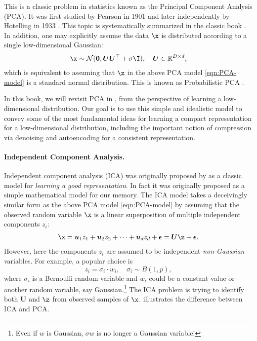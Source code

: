 \documentclass[../../book-main.tex]{subfiles}
\begin{document}
This is a classic problem in statistics known as the Principal Component Analysis (PCA). It was first studied by Pearson in 1901 \cite{Pearson1901} and later independently by Hotelling in 1933 \cite{Hotelling1933}. This topic is systematically summarized in the classic book \cite{Jolliffe1986,JolliffeI2002}.
In addition, one may explicitly assume the data $\x$ is distributed according to a single low-dimensional Gaussian:
\begin{equation}
    \x \sim \mathcal{N}(\boldsymbol{0}, \boldsymbol{U}\boldsymbol{U}^\top + \sigma \I), \quad \boldsymbol{U} \in \mathbb{R}^{D\times d},
\end{equation}
which is equivalent to assuming that  $\z$ in the above PCA model \eqref{eqn:PCA-model} is a standard normal distribution. 
This is known as Probabilistic PCA \cite{TippingM1999}. 

In this book, we will revisit  PCA in , from the perspective of learning a low-dimensional distribution. Our goal is to use this simple and idealistic model to convey some of the most fundamental ideas for learning a compact representation for a low-dimensional distribution, including the important notion of compression via denoising and autoencoding for a consistent representation.

\paragraph{Independent Component Analysis.}
Independent component analysis (ICA) was originally proposed by \cite{Ans-1985} as a classic model for {\em learning a good representation}. In fact it was originally proposed as a simple mathematical model for our memory. The ICA model takes a deceivingly similar form as the above PCA model \eqref{eqn:PCA-model} by assuming that the observed random variable $\x$ is a linear superposition of multiple independent components $z_i$:
\begin{equation}
    \x = \boldsymbol{u}_1 z_1 + \boldsymbol{u}_2 z_2 + \cdots + \boldsymbol{u}_d z_d  + \boldsymbol{\epsilon} =  \boldsymbol{U} \z + \boldsymbol{\epsilon}.
    \label{eqn:ICA-model}
\end{equation}
However, here the components $z_i$ are assumed to be independent {\em non-Gaussian} variables. For example, a popular choice is
\begin{equation}
    z_i = \sigma_i \cdot w_i, \quad \sigma_i \sim B(1,p),
    \label{eqn:ICA-modes}
\end{equation}
where $\sigma_i$ is a Bernoulli random variable and $w_i$ could be a constant value or another random variable, say Gaussian.\footnote{Even if $w$ is Gaussian, $\sigma w$ is no longer a Gaussian variable!}  The ICA problem is trying to identify both $\boldsymbol{U}$ and $\z$ from observed samples of $\x$.  illustrates the difference between ICA and PCA.
\end{document}
